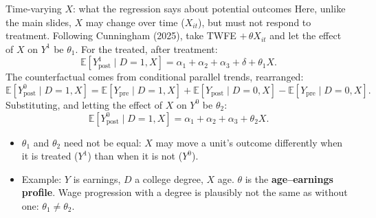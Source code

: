 \documentclass[
  11pt,
  ignorenonframetext,
  aspectratio=169,
]{beamer}
\providecommand{\tightlist}{%
  \setlength{\itemsep}{0pt}\setlength{\parskip}{0pt}}
\begin{document}
\begin{frame}{Time-varying \(X\): what the regression says about
potential outcomes}
\protect{}\label{time-varying-x-what-the-regression-says-about-potential-outcomes}
Here, unlike the main slides, \(X\) may change over time (\(X_{it}\)),
but must not respond to treatment. Following Cunningham (2025), take
TWFE \(+\,\theta X_{it}\) and let the effect of \(X\) on \(Y^1\) be
\(\theta_1\). For the treated, after treatment: \[
\mathbb{E}[Y^1_{\text{post}} \mid D=1, X] = \alpha_1 + \alpha_2 + \alpha_3 + \delta + \theta_1 X .
\] The counterfactual comes from conditional parallel trends,
rearranged: \[
\mathbb{E}[Y^0_{\text{post}} \mid D=1, X] = \mathbb{E}[Y_{\text{pre}} \mid D=1, X] + \mathbb{E}[Y_{\text{post}} \mid D=0, X] - \mathbb{E}[Y_{\text{pre}} \mid D=0, X] .
\] Substituting, and letting the effect of \(X\) on \(Y^0\) be
\(\theta_2\): \[
\mathbb{E}[Y^0_{\text{post}} \mid D=1, X] = \alpha_1 + \alpha_2 + \alpha_3 + \theta_2 X .
\]

\begin{itemize}
\tightlist
\item
  \(\theta_1\) and \(\theta_2\) need not be equal: \(X\) may move a
  unit's outcome differently when it is treated (\(Y^1\)) than when it
  is not (\(Y^0\)).
\item
  Example: \(Y\) is earnings, \(D\) a college degree, \(X\) age.
  \(\theta\) is the \textbf{age--earnings profile}. Wage progression
  with a degree is plausibly not the same as without one:
  \(\theta_1 \ne \theta_2\).
\end{itemize}
\end{frame}
\end{document}
